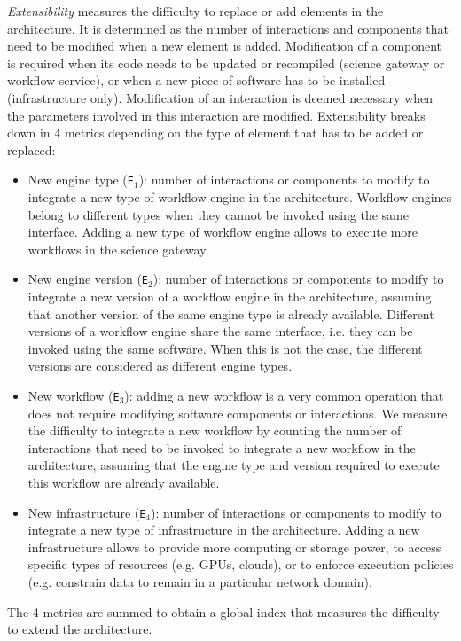 \documentclass[preprint,3p,twocolumn]{elsarticle}
\newcommand{\todo}[1]{\color{blue}\xspace[\emph{#1}]\xspace\color{black}}
\begin{document}
\emph{Extensibility} measures the difficulty to replace or add
elements in the architecture. It is determined as the number of
interactions and components that need to be modified when a new
element is added. Modification of a component is required when its
code needs to be updated or recompiled (science gateway or workflow
service), or when a new piece of software has to be installed
(infrastructure only). Modification of an interaction is deemed
necessary when the parameters involved in this interaction are
modified.  Extensibility breaks down in 4 metrics depending on the
type of element that has to be added or replaced:
\begin{itemize}[leftmargin=0cm,itemindent=0.35cm,itemsep=0cm]
\item New engine type (\texttt{E$_1$}): number of interactions or
  components to modify to integrate a new type of workflow engine in
  the architecture. Workflow engines belong to different types when
  they cannot be invoked using the same interface. Adding a new type
  of workflow engine allows to execute more workflows in the science
  gateway.
\item New engine version (\texttt{E$_2$}): number of interactions or
  components to modify to integrate a new version of a workflow engine
  in the architecture, assuming that another version of the same
  engine type is already available. Different versions of a workflow
  engine share the same interface, i.e. they can be invoked using the
  same software. When this is not the case, the different versions are
  considered as different engine types.
\item New workflow (\texttt{E$_3$}): adding a new workflow is a very
  common operation that does not require modifying software components
  or interactions. We measure the difficulty to integrate a new
  workflow by counting the number of interactions that need to be
  invoked to integrate a new workflow in the architecture, assuming
  that the engine type and version required to execute this workflow
  are already available.
\item New infrastructure (\texttt{E$_4$}): number of interactions or components to
  modify to integrate a new type of infrastructure in the
  architecture. Adding a new infrastructure allows to provide more
  computing or storage power, to access specific types of resources
  (e.g. GPUs, clouds), or to enforce execution policies
  (e.g. constrain data to remain in a particular network domain).
\end{itemize}
The 4 metrics are summed to obtain a global index that measures the
difficulty to extend the architecture.
\end{document}

